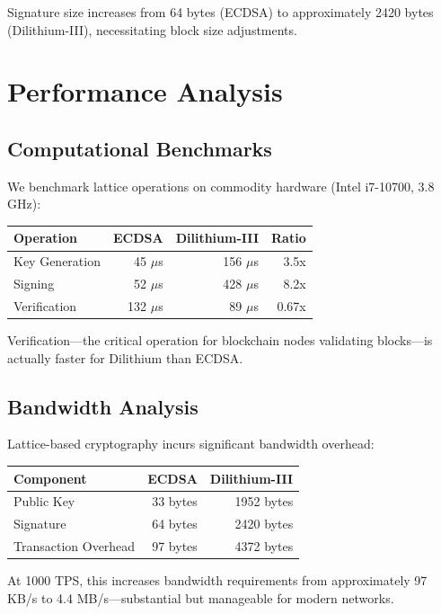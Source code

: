 \documentclass[11pt,a4paper]{article}
\begin{document}
Signature size increases from 64 bytes (ECDSA) to approximately 2420 bytes (Dilithium-III), necessitating block size adjustments.

\section{Performance Analysis}

\subsection{Computational Benchmarks}

We benchmark lattice operations on commodity hardware (Intel i7-10700, 3.8 GHz):

\begin{center}
\begin{tabular}{|l|r|r|r|}
\hline
\textbf{Operation} & \textbf{ECDSA} & \textbf{Dilithium-III} & \textbf{Ratio} \\
\hline
Key Generation & 45 $\mu$s & 156 $\mu$s & 3.5x \\
Signing & 52 $\mu$s & 428 $\mu$s & 8.2x \\
Verification & 132 $\mu$s & 89 $\mu$s & 0.67x \\
\hline
\end{tabular}
\end{center}

Verification---the critical operation for blockchain nodes validating blocks---is actually faster for Dilithium than ECDSA.

\subsection{Bandwidth Analysis}

Lattice-based cryptography incurs significant bandwidth overhead:

\begin{center}
\begin{tabular}{|l|r|r|}
\hline
\textbf{Component} & \textbf{ECDSA} & \textbf{Dilithium-III} \\
\hline
Public Key & 33 bytes & 1952 bytes \\
Signature & 64 bytes & 2420 bytes \\
Transaction Overhead & 97 bytes & 4372 bytes \\
\hline
\end{tabular}
\end{center}

At 1000 TPS, this increases bandwidth requirements from approximately 97 KB/s to 4.4 MB/s---substantial but manageable for modern networks.
\end{document}
